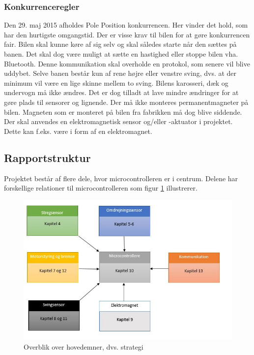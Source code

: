 \subsubsection{Konkurrenceregler}
\label{kon_regler}
Den 29. maj 2015 afholdes Pole Position konkurrencen. Her vinder det hold, som har den hurtigste omgangstid. Der er visse krav til bilen for at gøre konkurrencen fair. Bilen skal kunne køre af sig selv og skal således starte når den sættes på banen. Det skal dog være muligt at sætte en hastighed eller stoppe bilen vha. Bluetooth. Denne kommunikation skal overholde en protokol, som senere vil blive uddybet. Selve banen består kun af rene højre eller venstre sving, dvs. at der minimum vil være en lige skinne mellem to sving. Bilens karosseri, dæk og undervogn må ikke ændres. Det er dog tilladt at lave mindre ændringer for at gøre plads til sensorer og lignende. Der må ikke monteres permanentmagneter på bilen. Magneten som er monteret på bilen fra fabrikken må dog blive siddende. Der skal anvendes en elektromagnetisk sensor og/eller -aktuator i projektet. Dette kan f.eks. være i form af en elektromagnet. 


\subsection{Rapportstruktur}
Projektet består af flere dele, hvor microcontrolleren er i centrum. Delene har forskellige relationer til microcontrolleren som figur \ref{Strategi} illustrerer.\\

\begin{figure}[h!]
\center
\includegraphics[scale=0.4]{./Graphics/Strategi}
\caption{Overblik over hovedemner, dvs. strategi}
\label{Strategi}
\end{figure}

